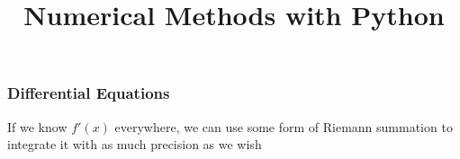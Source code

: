 \documentclass{beamer}
\title{Numerical Methods with Python}
\date{}
\begin{document}
	
	\frame{\titlepage}
	
	\begin{frame}
		\frametitle{Differential Equations}
		If we know $f'(x)$ everywhere, we can use some form of Riemann summation to integrate it with as much precision as we wish
	\end{frame}
\end{document}
